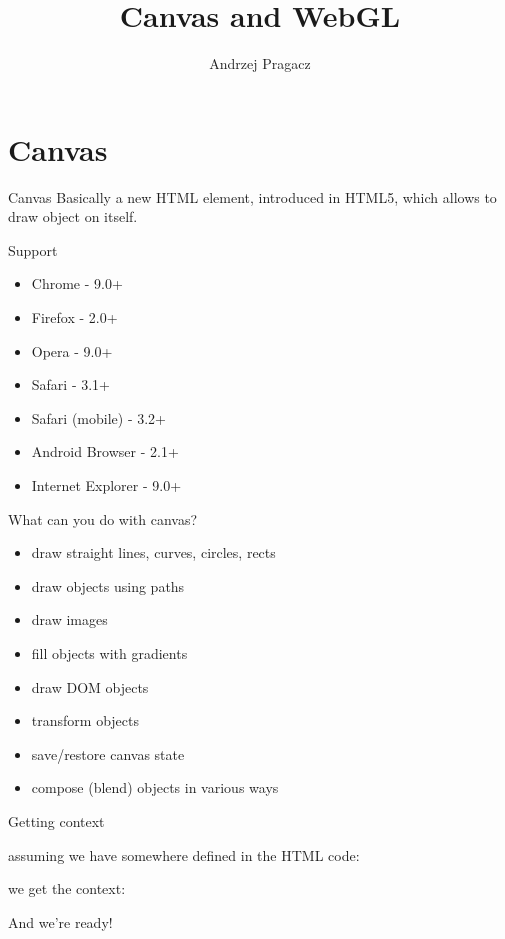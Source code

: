 \documentclass{beamer}
\title{Canvas and WebGL}
\author{Andrzej Pragacz}
\begin{document}
\titlepage

\section{Canvas}

\begin{frame}{Canvas}
Basically a new HTML element, introduced in HTML5, which allows to draw object on itself.
\end{frame}

\begin{frame}{Support}
\begin{itemize}
\item Chrome - 9.0+
\item Firefox - 2.0+
\item Opera - 9.0+
\item Safari - 3.1+
\item Safari (mobile) - 3.2+
\item Android Browser - 2.1+
\item Internet Explorer - 9.0+
\end{itemize}
\end{frame}

\begin{frame}{What can you do with canvas?}
\begin{itemize}
    \item draw straight lines, curves, circles, rects
    \item draw objects using paths
    \item draw images
    \item fill objects with gradients
    \item draw DOM objects
    \item transform objects
    \item save/restore canvas state
    \item compose (blend) objects in various ways
\end{itemize}
\end{frame}


\begin{frame}{Getting context}

assuming we have somewhere defined in the HTML code:

\lstset{ language=HTML, basicstyle=\scriptsize,frame=single}


we get the context:



And we're ready!

\end{frame}
\end{document}
